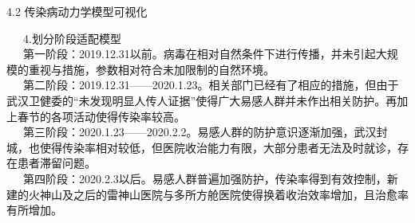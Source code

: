 \documentclass[
  ignorenonframetext,
]{beamer}
\begin{document}
\begin{frame}{4.2 传染病动力学模型可视化}
\protect\hypertarget{section-16}{}

  4.划分阶段适配模型\\
  第一阶段：2019.12.31以前。病毒在相对自然条件下进行传播，并未引起大规模的重视与措施，参数相对符合未加限制的自然环境。\\
  第二阶段：2019.12.31------2020.1.23。相关部门已经有了相应的措施，但由于武汉卫健委的``未发现明显人传人证据''使得广大易感人群并未作出相关防护。再加上春节的各项活动使得传染率较高。\\
  第三阶段：2020.1.23------2020.2.2。易感人群的防护意识逐渐加强，武汉封城，也使得传染率相对较低，但医院收治能力有限，大部分患者无法及时就诊，存在患者滞留问题。\\
  第四阶段：2020.2.3以后。易感人群普遍加强防护，传染率得到有效控制，新建的火神山及之后的雷神山医院与多所方舱医院使得换着收治效率增加，且治愈率有所增加。

\end{frame}
\end{document}
